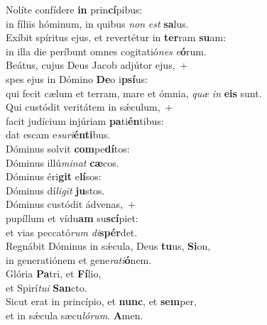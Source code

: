 \evenverse Nolíte confídere \textbf{in} prin\textbf{cí}pibus:~\*\\
\evenverse in fíliis hóminum, in quibus \textit{non} \textit{est} \textbf{sa}lus.\\
\oddverse Exíbit spíritus ejus, et revertétur in \textbf{ter}ram \textbf{su}am:~\*\\
\oddverse in illa die períbunt omnes cogitatió\textit{nes} \textit{e}\textbf{ó}rum.\\
\evenverse Beátus, cujus Deus Jacob adjútor ejus,~+\\
\evenverse  spes ejus in Dómino \textbf{De}o i\textbf{psí}us:~\*\\
\evenverse qui fecit cælum et terram, mare et ómnia, \textit{quæ} \textit{in} \textbf{e}\textbf{is} sunt.\\
\oddverse Qui custódit veritátem in sǽculum,~+\\
\oddverse  facit judícium injúriam \textbf{pa}ti\textbf{én}tibus:~\*\\
\oddverse dat escam e\textit{su}\textit{ri}\textbf{én}\textbf{ti}bus.\\
\evenverse Dóminus solvit \textbf{com}pe\textbf{dí}tos:~\*\\
\evenverse Dóminus illú\textit{mi}\textit{nat} \textbf{cæ}cos.\\
\oddverse Dóminus éri\textbf{git} e\textbf{lí}sos:~\*\\
\oddverse Dóminus dí\textit{li}\textit{git} \textbf{ju}stos.\\
\evenverse Dóminus custódit ádvenas,~+\\
\evenverse  pupíllum et vídu\textbf{am} su\textbf{scí}piet:~\*\\
\evenverse et vias peccató\textit{rum} \textit{di}\textbf{spér}det.\\
\oddverse Regnábit Dóminus in sǽcula, Deus \textbf{tu}us, \textbf{Si}on,~\*\\
\oddverse in generatiónem et gene\textit{ra}\textit{ti}\textbf{ó}nem.\\
\evenverse Glória \textbf{Pa}tri, et \textbf{Fí}lio,~\*\\
\evenverse et Spirí\textit{tu}\textit{i} \textbf{San}cto.\\
\oddverse Sicut erat in princípio, et \textbf{nunc}, et \textbf{sem}per,~\*\\
\oddverse et in sǽcula sæcu\textit{ló}\textit{rum}. \textbf{A}men.\\
